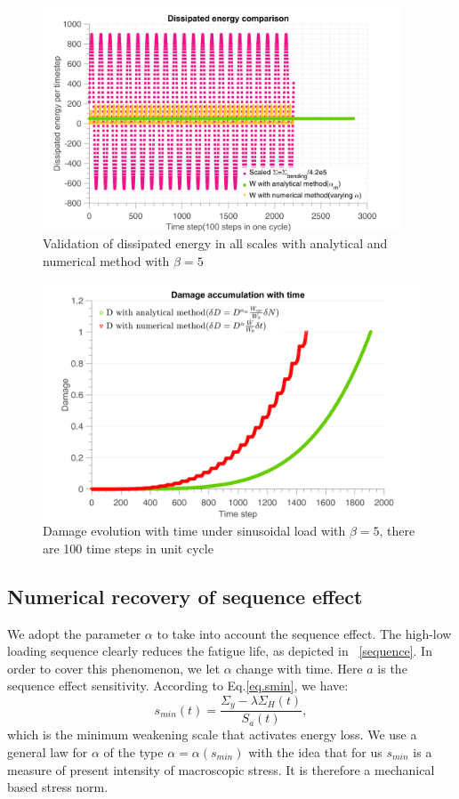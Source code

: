 \documentclass[3p,times,number,review]{elsarticle}
\newcommand{\figref}[1]{\figurename~\ref{#1}}
\begin{document}
\begin{figure}[!h]
	\centering
	\includegraphics[width=0.95\textwidth]{figures//W3methods_bigbeta.png} 
	\caption{Validation of dissipated energy in all scales with analytical and numerical method with $\beta=5$ }
	\label{fig.W3methods_bigbeta}
\end{figure}
\begin{figure}[!h]
	\centering
	\includegraphics[width=\textwidth]{figures//damsin_bigbeta.png} 
	\caption{Damage evolution with time under sinusoidal load with $\beta=5$, there are 100 time steps in unit cycle}
	\label{fig.damsin_bigbeta}
\end{figure}

\clearpage
\subsection{Numerical recovery of sequence effect}
We adopt the parameter $\alpha$ to take into account the sequence effect. The high-low loading sequence clearly reduces the fatigue life, as depicted in \figref{sequence}. In order to cover this phenomenon, we let $\alpha$ change with time. Here $a$ is the sequence effect sensitivity. According to Eq.\eqref{eq.smin}, we have:
$$
s_{min}(t)=\dfrac{\Sigma_y-\lambda \Sigma_H(t)}{S_{a}(t)},
$$
which is the minimum weakening scale that activates energy loss.  We use a general law for $\alpha$ of the type $\alpha = \alpha (s_{min})$ with the idea that for us $s_{min}$ is a measure of present intensity of macroscopic stress. It is therefore a mechanical based stress norm. 
\end{document}
